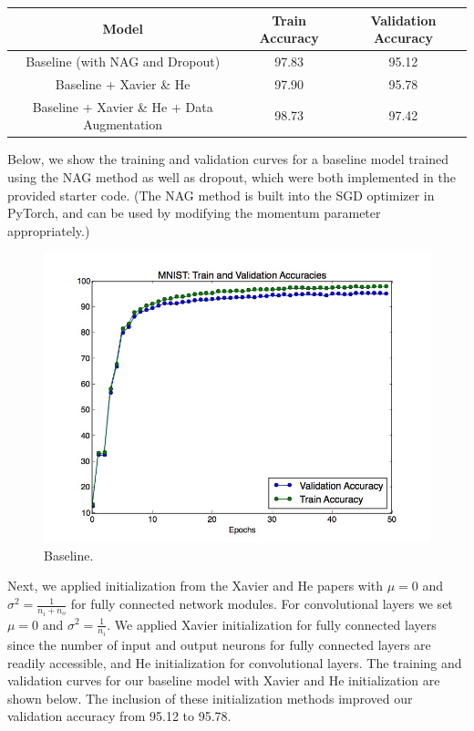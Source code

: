 \documentclass[a4paper]{article}
\begin{document}
\begin{enumerate}
{\begin{center}
\begin{tabular}{ |c|c|c| } 
 \hline
 Model & Train Accuracy & Validation Accuracy \\ \hline
 Baseline (with NAG and Dropout) & 97.83 & 95.12 \\ 
 Baseline + Xavier \& He & 97.90 & 95.78 \\ 
 Baseline + Xavier \& He + Data Augmentation & 98.73 & 97.42 \\ 
 \hline
\end{tabular}
\end{center}

Below, we show the training and validation curves for a baseline model trained using the NAG method as well as dropout, which were both implemented in the provided starter code. (The NAG method is built into the SGD optimizer in PyTorch, and can be used by modifying the momentum parameter appropriately.)

\begin{figure}[H]
  \includegraphics[width=12cm]{../plots/accuracies_baseline.jpg}
  \centering
  \caption{Baseline.}
  \label{fig:boat1}
\end{figure}

Next, we applied initialization from the Xavier and He papers with $\mu=0$ and $\sigma^2 = \frac{1}{n_i + n_o}$ for fully connected network modules. For convolutional layers we set $\mu=0$ and $\sigma^2 = \frac{1}{n_i}$. 
We applied Xavier initialization for fully connected layers since the number of input and output neurons for fully connected layers are readily accessible, and He initialization for convolutional layers. The training and validation curves for our baseline model with Xavier and He initialization are shown below. The inclusion of these initialization methods improved our validation accuracy from 95.12 to 95.78.

}
\end{enumerate}
\end{document}
